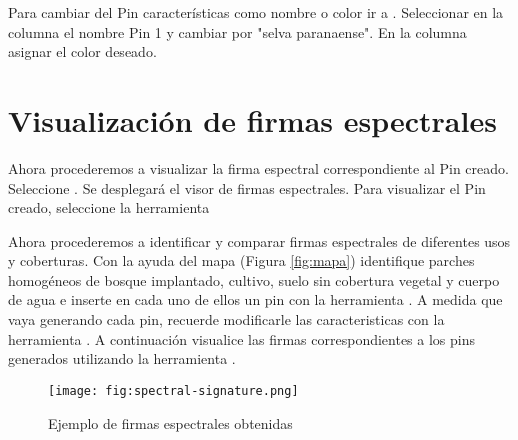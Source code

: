 Para cambiar del Pin características como nombre o color ir a . Seleccionar en la columna  el nombre Pin 1 y cambiar por "selva paranaense". En la columna  asignar el color deseado.

\section{Visualización de firmas espectrales}

Ahora procederemos a visualizar la firma espectral correspondiente al Pin creado. Seleccione . Se desplegará el visor de firmas espectrales. Para visualizar el Pin creado, seleccione la herramienta 


Ahora procederemos a identificar y comparar firmas espectrales de diferentes usos y coberturas. Con la ayuda del mapa (Figura \ref{fig:mapa}) identifique parches homogéneos de bosque implantado, cultivo, suelo sin cobertura vegetal y cuerpo de agua e inserte en cada uno de ellos un pin con la herramienta . A medida que vaya generando cada pin, recuerde modificarle las caracteristicas con la herramienta  . A continuación visualice las firmas correspondientes a los pins generados utilizando la herramienta .

\begin{figure}[h!]
    \centering
    \texttt{[image: fig:spectral-signature.png]}
    \caption{Ejemplo de firmas espectrales obtenidas}
    \label{fig:spectral-signature}
\end{figure}

